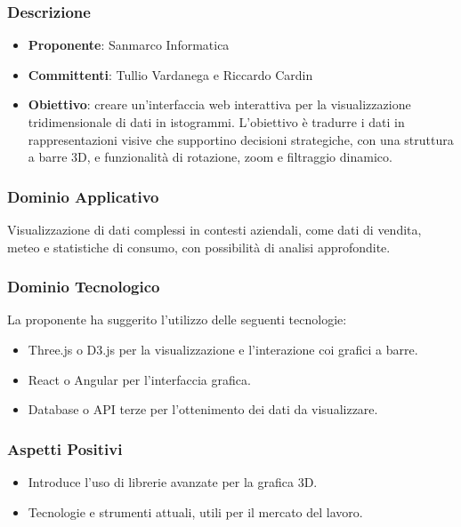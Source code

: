 \documentclass[a4paper, 12pt]{article}
\begin{document}
\subsubsection{Descrizione}
\begin{itemize}
    \item \textbf{Proponente}: Sanmarco Informatica
    \item \textbf{Committenti}: Tullio Vardanega e Riccardo Cardin
    \item \textbf{Obiettivo}: creare un'interfaccia web interattiva per la visualizzazione tridimensionale di dati in istogrammi. L’obiettivo è tradurre i dati in rappresentazioni visive che supportino decisioni strategiche, con una struttura a barre 3D, e funzionalità di rotazione, zoom e filtraggio dinamico.

\end{itemize}

\subsubsection{Dominio Applicativo}
Visualizzazione di dati complessi in contesti aziendali, come dati di vendita, meteo e statistiche di consumo, con possibilità di analisi approfondite.

\subsubsection{Dominio Tecnologico}
La proponente ha suggerito l’utilizzo delle seguenti tecnologie:
\begin{itemize}
    \item Three.js o  D3.js  per la visualizzazione e l'interazione coi grafici a barre.
    \item React o Angular per l’interfaccia grafica.
    \item Database o API terze per l’ottenimento dei dati da visualizzare.
\end{itemize}

\subsubsection{Aspetti Positivi}
\begin{itemize}
    \item Introduce l'uso di librerie avanzate per la grafica 3D.
    \item Tecnologie e strumenti attuali, utili per il mercato del lavoro.
\end{itemize}
\end{document}
